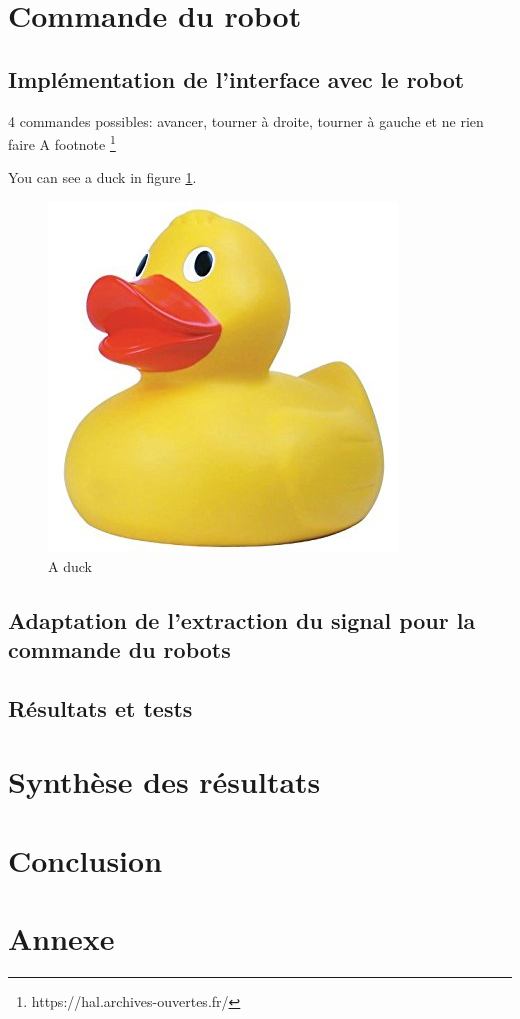 \documentclass[11pt]{article}
\begin{document}
\cleardoublepage


\section{Commande du robot}

 	  
\subsection{Implémentation de l'interface avec le robot}
4 commandes possibles: avancer, tourner à droite, tourner à gauche et ne rien faire
A footnote \footnote{https://hal.archives-ouvertes.fr/}

You can see a duck in figure \ref{fig:duck}.

\begin{figure}[!h]
\centering
\includegraphics[scale=0.3]{bidon.jpg}
\caption{A duck}
\label{fig:duck}
\end{figure}

\cleardoublepage

\subsection{Adaptation de l'extraction du signal pour la commande du robots}

\cleardoublepage


\subsection{Résultats et tests}

\cleardoublepage



\section{Synthèse des résultats}

\cleardoublepage


\section{Conclusion}
\cleardoublepage



\section{Annexe}

\cleardoublepage
\end{document}
